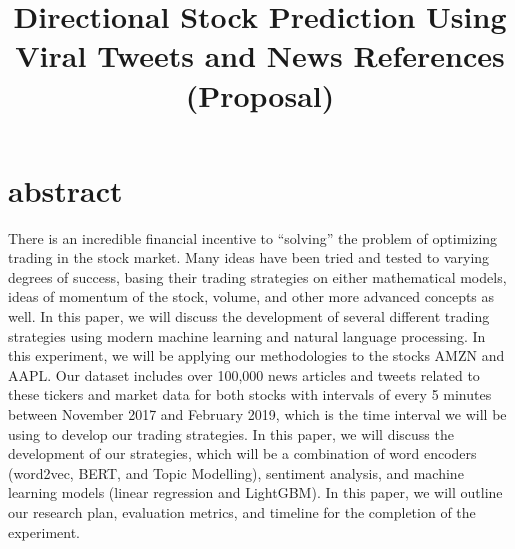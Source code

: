 \documentclass[conference]{IEEEtran}
\begin{document}
\title{Directional Stock Prediction Using Viral Tweets and News References (Proposal)\\
}

\author{
\and
{}
\and
{}
\and
{}
\and
{}
}

\maketitle

\section{abstract}
There is an incredible financial incentive to “solving” the problem of optimizing trading in the stock market. Many ideas have been tried and tested to varying degrees of success, basing their trading strategies on either mathematical models, ideas of momentum of the stock, volume, and other more advanced concepts as well. In this paper, we will discuss the development of several different trading strategies using modern machine learning and natural language processing. In this experiment, we will be applying our methodologies to the stocks AMZN and AAPL. Our dataset includes over 100,000 news articles and tweets related to these tickers and market data for both stocks with intervals of every 5 minutes between November 2017 and February 2019, which is the time interval we will be using to develop our trading strategies. In this paper, we will discuss the development of our strategies, which will be a combination of word encoders (word2vec, BERT, and Topic Modelling), sentiment analysis, and machine learning models (linear regression and LightGBM). In this paper, we will outline our research plan, evaluation metrics, and timeline for the completion of the experiment. 
\end{document}

